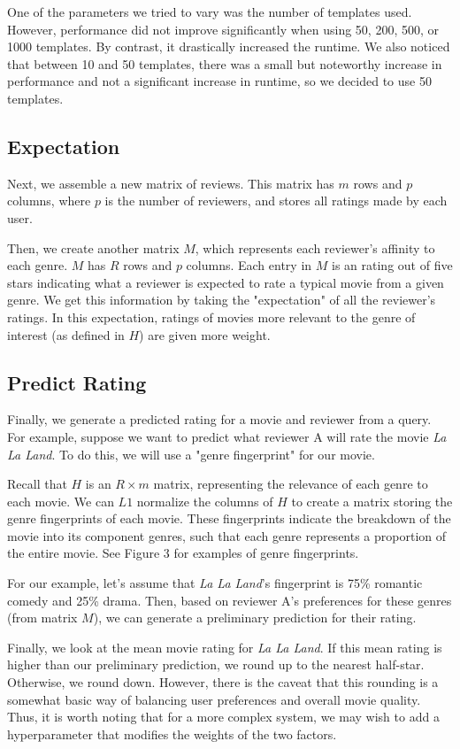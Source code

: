 \documentclass[letterpaper, 10 pt, conference]{ieeeconf}  %
\begin{document}
One of the parameters we tried to vary was the number of templates used. However, performance did not improve significantly when using 50, 200, 500, or 1000 templates. By contrast, it drastically increased the runtime. We also noticed that between 10 and 50 templates, there was a small but noteworthy increase in performance and not a significant increase in runtime, so we decided to use 50 templates.

\smallbreak
\subsection{Expectation}

Next, we assemble a new matrix of reviews. This matrix has $m$ rows and $p$ columns, where $p$ is the number of reviewers, and stores all ratings made by each user.

Then, we create another matrix $M$, which represents each reviewer's affinity to each genre. 
$M$ has $R$ rows and $p$ columns. Each entry in $M$ is an rating out of five stars indicating what a reviewer is expected to rate a typical movie from a given genre.
We get this information by taking the "expectation" of all the reviewer's ratings. In this expectation, ratings of movies more relevant to the genre of interest (as defined in $H$) are given more weight.

\subsection{Predict Rating}
Finally, we generate a predicted rating for a movie and reviewer from a query. For example, suppose we want to predict what reviewer A will rate the movie \textit{La La Land}. To do this, we will use a "genre fingerprint" for our movie.

Recall that $H$ is an $R \times m$ matrix, representing the relevance of each genre to each movie. We can $L1$ normalize the columns of $H$ to create a matrix storing the genre fingerprints of each movie.
These fingerprints indicate the breakdown of the movie into its component genres, such that each genre represents a proportion of the entire movie. See Figure 3 for examples of genre fingerprints.

For our example, let's assume that \textit{La La Land}'s fingerprint is 75\% romantic comedy and 25\% drama. Then, based on reviewer A's preferences for these genres (from matrix $M$), we can generate a preliminary prediction for their rating.

Finally, we look at the mean movie rating for \textit{La La Land}. If this mean rating is higher than our preliminary prediction, we round up to the nearest half-star. Otherwise, we round down. However, there is the caveat that this rounding is a somewhat basic way of balancing user preferences and overall movie quality. Thus, it is worth noting that for a more complex system, we may wish to add a hyperparameter that modifies the weights of the two factors.
\end{document}
